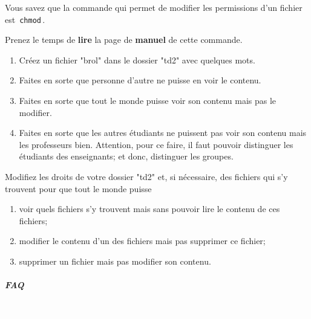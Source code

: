 \documentclass[a4paper,11pt]{article}
\begin{document}
Vous savez que la commande qui permet de modifier les permissions d'un fichier est 
\,\verb|chmod|\,.  

\par

Prenez le temps de \textbf{lire} 
la page de \textbf{manuel} de cette commande.   

\par
	
	\begin{Tutoriel}{} 
					\begin{enumerate}
	
	\item Cr\'eez un fichier "brol" dans le dossier "td2" avec quelques mots.
	\item Faites en sorte que personne d'autre ne puisse en voir le contenu.
	\item Faites en sorte que tout le monde puisse voir son contenu mais pas le modifier. 
	\item 
	Faites en sorte que les autres \'etudiants ne puissent pas voir son contenu mais les professeurs bien. 
	Attention, pour ce faire, il faut pouvoir distinguer les \'etudiants des enseignants; et donc, distinguer les groupes.
	
\end{enumerate}
		
	\end{Tutoriel}

	\begin{Tutoriel}{} 
          
Modifiez les droits de votre dossier "td2" et, si n\'ecessaire, 
des fichiers qui s'y trouvent pour que tout le monde puisse  

\par

\begin{enumerate}
	
	\item voir quels fichiers s'y trouvent mais sans pouvoir lire le contenu de ces fichiers;
	\item modifier le contenu d'un des fichiers mais pas supprimer ce fichier;
	\item supprimer un fichier mais pas modifier son contenu.
\end{enumerate}
	
\end{Tutoriel}


		\subparagraph{FAQ} 

\textcolor{white}{.} \par
\end{document}
